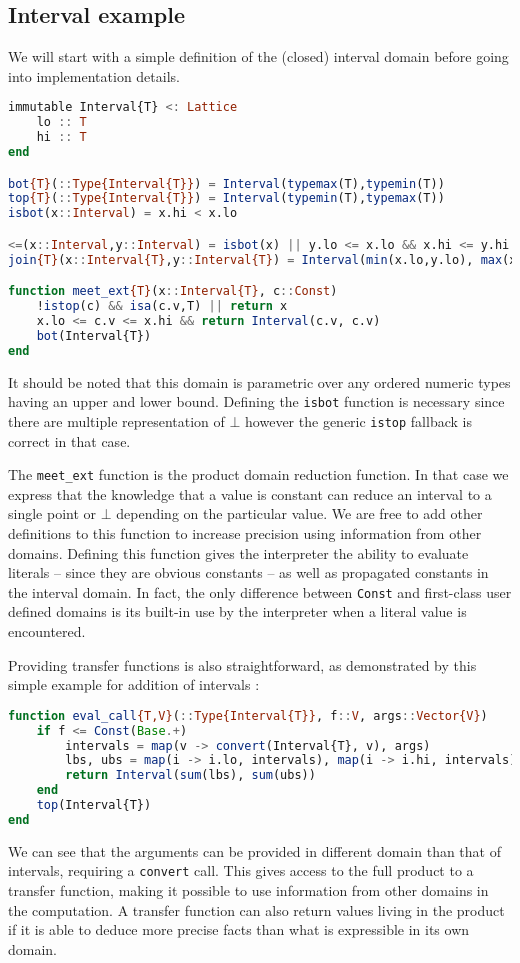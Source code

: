\documentclass[14pt]{article}
\begin{document}
\subsection*{Interval example}
We will start with a simple definition of the (closed) interval domain before going into implementation details.
\begin{singlespace}
\begin{lstlisting}[language=julia]
immutable Interval{T} <: Lattice
    lo :: T
    hi :: T
end

bot{T}(::Type{Interval{T}}) = Interval(typemax(T),typemin(T))
top{T}(::Type{Interval{T}}) = Interval(typemin(T),typemax(T))
isbot(x::Interval) = x.hi < x.lo

<=(x::Interval,y::Interval) = isbot(x) || y.lo <= x.lo && x.hi <= y.hi
join{T}(x::Interval{T},y::Interval{T}) = Interval(min(x.lo,y.lo), max(x.hi,y.hi))

function meet_ext{T}(x::Interval{T}, c::Const)
    !istop(c) && isa(c.v,T) || return x
    x.lo <= c.v <= x.hi && return Interval(c.v, c.v)
    bot(Interval{T})
end
\end{lstlisting}
\end{singlespace}
It should be noted that this domain is parametric over any ordered numeric types having an upper and lower bound. Defining the \verb~isbot~ function is necessary since there are multiple representation of $\bot$ however the generic \verb~istop~ fallback is correct in that case.

The \verb~meet_ext~ function is the product domain reduction function. In that case we express that the knowledge that a value is constant can reduce an interval to a single point or $\bot$ depending on the particular value. We are free to add other definitions to this function to increase precision using information from other domains.
Defining this function gives the interpreter the ability to evaluate literals -- since they are obvious constants -- as well as propagated constants in the interval domain. In fact, the only difference between \verb~Const~ and first-class user defined domains is its built-in use by the interpreter when a literal value is encountered. 

Providing transfer functions is also straightforward, as demonstrated by this simple example for addition of intervals :
\begin{singlespace}
\begin{lstlisting}[language=julia]
function eval_call{T,V}(::Type{Interval{T}}, f::V, args::Vector{V})
    if f <= Const(Base.+)
        intervals = map(v -> convert(Interval{T}, v), args)
        lbs, ubs = map(i -> i.lo, intervals), map(i -> i.hi, intervals)
        return Interval(sum(lbs), sum(ubs))
    end
    top(Interval{T})
end
\end{lstlisting}
\end{singlespace}
We can see that the arguments can be provided in different domain than that of intervals, requiring a \verb~convert~ call. This gives access to the full product to a transfer function, making it possible to use information from other domains in the computation. A transfer function can also return values living in the product if it is able to deduce more precise facts than what is expressible in its own domain.
\end{document}
